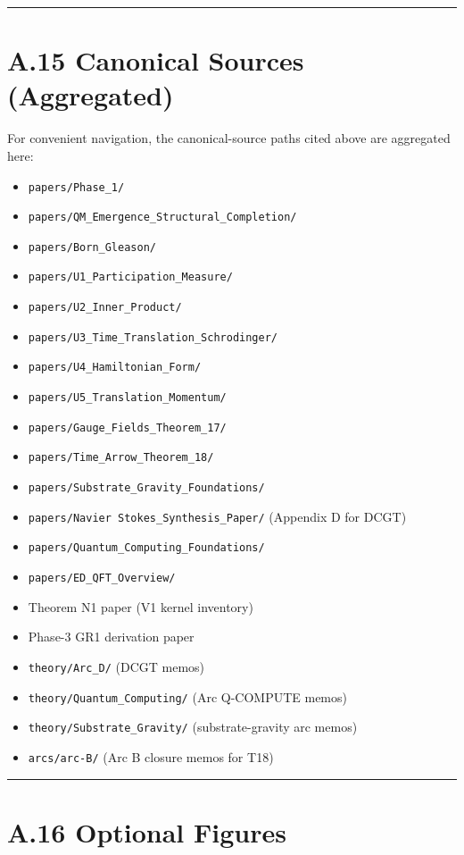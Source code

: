 \documentclass[11pt]{book}
\begin{document}
\bigskip\hrule\bigskip

\section{A.15 Canonical Sources (Aggregated)}

For convenient navigation, the canonical-source paths cited above are aggregated here:

\begin{itemize}
\item \texttt{papers/Phase\_1/}
\item \texttt{papers/QM\_Emergence\_Structural\_Completion/}
\item \texttt{papers/Born\_Gleason/}
\item \texttt{papers/U1\_Participation\_Measure/}
\item \texttt{papers/U2\_Inner\_Product/}
\item \texttt{papers/U3\_Time\_Translation\_Schrodinger/}
\item \texttt{papers/U4\_Hamiltonian\_Form/}
\item \texttt{papers/U5\_Translation\_Momentum/}
\item \texttt{papers/Gauge\_Fields\_Theorem\_17/}
\item \texttt{papers/Time\_Arrow\_Theorem\_18/}
\item \texttt{papers/Substrate\_Gravity\_Foundations/}
\item \texttt{papers/Navier Stokes\_Synthesis\_Paper/} (Appendix D for DCGT)
\item \texttt{papers/Quantum\_Computing\_Foundations/}
\item \texttt{papers/ED\_QFT\_Overview/}
\item Theorem N1 paper (V1 kernel inventory)
\item Phase-3 GR1 derivation paper
\item \texttt{theory/Arc\_D/} (DCGT memos)
\item \texttt{theory/Quantum\_Computing/} (Arc Q-COMPUTE memos)
\item \texttt{theory/Substrate\_Gravity/} (substrate-gravity arc memos)
\item \texttt{arcs/arc-B/} (Arc B closure memos for T18)
\end{itemize}

\bigskip\hrule\bigskip

\section{A.16 Optional Figures}
\end{document}
